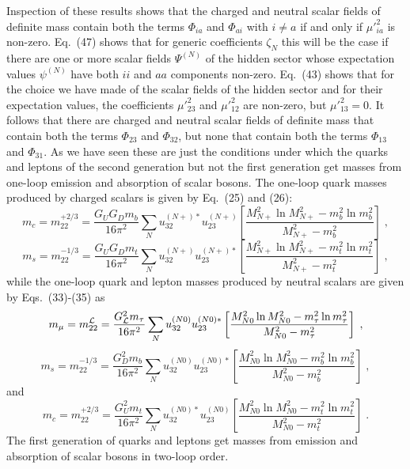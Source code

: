 \documentclass[12pt]{article}
\begin{document}
Inspection of these results shows that the charged and neutral scalar fields of definite mass contain both the terms $\Phi_{ia}$ and $\Phi_{ai}$ with $i\neq a$ if and only if $\mu'^2_{ia}$ is non-zero.  Eq.~(47) shows that for generic coefficients $\zeta_N$ this will be the case if there are one or more scalar fields $\Psi^{(N)}$ of the hidden sector whose expectation values $\psi^{(N)}$ have both $ii$ and $aa$ components non-zero.   
Eq.~(43) shows that for the choice we have made of the scalar fields of the hidden sector and for their expectation values, the coefficients $\mu'^2_{23}$ and $\mu'^2_{12}$ are non-zero, but $\mu'^2_{13}=0$.  It follows that there are  charged and neutral scalar fields of definite mass that contain both the terms $\Phi_{23}$ and $\Phi_{32}$, but none that contain both the terms $\Phi_{13}$ and $\Phi_{31}$.    As we have seen these are just the conditions  under which the quarks and leptons of the second generation but not the first generation get masses from one-loop emission and absorption of scalar bosons.  The one-loop  quark masses produced by charged scalars is given by Eq.~(25) and (26):
\begin{equation}
m_c=m^{+2/3}_{22}=\frac{G_UG_Dm_b}{16\pi^2}\sum_{N}  u_{32}^{(N+)*}u_{23}^{(N+)}\left[\frac{M_{N+}^2\ln M_{N+}^2-m_b^2\ln m_b^2}{M_{N+}^2-m_b^2}
\right] \;,
\end{equation}
\begin{equation}
m_s=m^{-1/3}_{22}=\frac{G_UG_Dm_t}{16 \pi^2}\sum_{N}  u_{32}^{(N+)}u_{23}^{(N+)*}\left[\frac{M_{N+}^2\ln M_{N+}^2-m_t^2\ln m_t^2}{M_{N+}^2-m_t^2}\right]
 \;,
\end{equation}
while the one-loop quark and lepton masses produced by neutral scalars are given by Eqs.~(33)-(35) as
\begin{equation}
m_\mu=m^{\cal L}_{22}=\frac{G_{\cal L}^2m_\tau }{16 \pi^2}\sum_{N}  u_{32}^{(N0)}u_{23}^{(N0)*}\left[\frac{M_{N0}^2\ln M_{N0}^2-m_\tau^2\ln m_\tau^2}{M_{N0}^2-m_\tau^2}\right]
 \;,
\end{equation}
\begin{equation}
m_s=m^{-1/3}_{22}=\frac{G^2_Dm_b}{16 \pi^2}\sum_{N}  u_{32}^{(N0)}u_{23}^{(N0)*}\left[\frac{M_{N0}^2\ln M_{N0}^2-m_b^2\ln m_b^2}{M_{N0}^2-m_b^2}\right]
 \;,
\end{equation}
and
\begin{equation}
m_c=m^{+2/3}_{22}=\frac{G_U^2m_t}{16 \pi^2}\sum_{N}  u_{32}^{(N0)*}u_{23}^{(N0)}\left[\frac{M_{N0}^2\ln M_{N0}^2-m_t^2\ln m_t^2}{M_{N0}^2-m_t^2}\right]
 \;.
\end{equation}
The first generation of quarks and leptons get masses from emission and absorption of scalar bosons in two-loop order.
\end{document}
